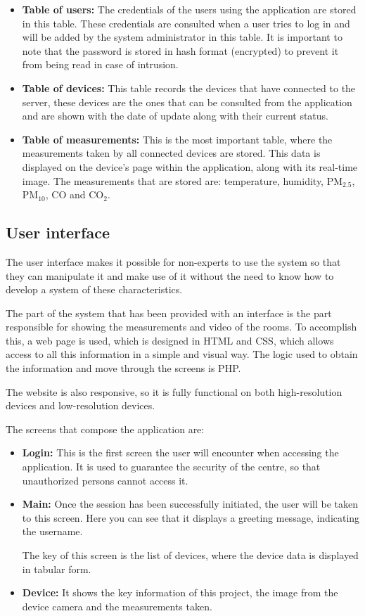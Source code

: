\begin{itemize}
	\item \textbf{Table of users:} The credentials of the users using the application are stored in this table. These credentials are consulted when a user tries to log in and will be added by the system administrator in this table. It is important to note that the password is stored in hash format (encrypted) to prevent it from being read in case of intrusion.
	\item \textbf{Table of devices:} This table records the devices that have connected to the server, these devices are the ones that can be consulted from the application and are shown with the date of update along with their current status.
	\item \textbf{Table of measurements:} This is the most important table, where the measurements taken by all connected devices are stored. This data is displayed on the device's page within the application, along with its real-time image. The measurements that are stored are: temperature, humidity, PM$_{2.5}$, PM$_{10}$, CO and CO$_2$.
\end{itemize}

\subsection{User interface}\label{subsec:user-interface}
The user interface makes it possible for non-experts to use the system so that they can manipulate it and make use of it without the need to know how to develop a system of these characteristics.

The part of the system that has been provided with an interface is the part responsible for showing the measurements and video of the rooms. To accomplish this, a web page is used, which is designed in HTML and CSS, which allows access to all this information in a simple and visual way. The logic used to obtain the information and move through the screens is PHP\@.

The website is also responsive, so it is fully functional on both high-resolution devices and low-resolution devices.

The screens that compose the application are:
\begin{itemize}
	\item \textbf{Login:} This is the first screen the user will encounter when accessing the application. It is used to guarantee the security of the centre, so that unauthorized persons cannot access it.
	\item \textbf{Main:} Once the session has been successfully initiated, the user will be taken to this screen. Here you can see that it displays a greeting message, indicating the username.

	The key of this screen is the list of devices, where the device data is displayed in tabular form.
	\item \textbf{Device:} It shows the key information of this project, the image from the device camera and the measurements taken.
\end{itemize}

